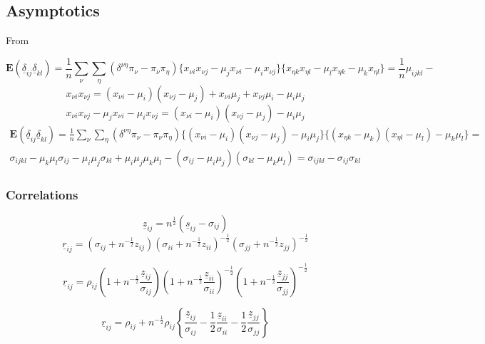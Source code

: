 \documentclass[
  12pt,
  letterpaper,
  DIV=11,
  numbers=noendperiod]{scrartcl}
\newcommand{\ul}[1]{\underline{#1}}
\begin{document}
\subsection{Asymptotics}\label{asymptotics}

From

\[
\mathbf{E}(\ul{\delta}_{ij}\ul{\delta}_{kl})=\frac{1}{n}\sum_\nu\sum_\eta(\delta^{\nu\eta}\pi_\nu-\pi_\nu\pi_\eta)
\{x_{\nu i}x_{\nu j}
-\mu_jx_{\nu i}-\mu_ix_{\nu j}\}\{x_{\eta k}x_{\eta l}
-\mu_lx_{\eta k}-\mu_kx_{\eta l}\}=\frac{1}{n}\mu_{ijkl}-
\] \[
x_{\nu i}x_{\nu j}=(x_{\nu i}-\mu_i)(x_{\nu j}-\mu_j)+x_{\nu i}\mu_j+x_{\nu j}\mu_i-\mu_i\mu_j
\] \[x_{\nu i}x_{\nu j}
-\mu_jx_{\nu i}-\mu_ix_{\nu j}=(x_{\nu i}-\mu_i)(x_{\nu j}-\mu_j)-\mu_i\mu_j
\] \begin{multline}
\mathbf{E}(\ul{\delta}_{ij}\ul{\delta}_{kl})=\frac{1}{n}\sum_\nu\sum_\eta(\delta^{\nu\eta}\pi_\nu-\pi_\nu\pi_\eta)
\{(x_{\nu i}-\mu_i)(x_{\nu j}-\mu_j)-\mu_i\mu_j\}\{(x_{\eta k}-\mu_k)(x_{\eta l}-\mu_l)-\mu_k\mu_l\}=\\
\sigma_{ijkl}-\mu_k\mu_l\sigma_{ij}-\mu_i\mu_j\sigma_{kl}+\mu_i\mu_j\mu_k\mu_l-(\sigma_{ij}-\mu_i\mu_j)(\sigma_{kl}-\mu_k\mu_l)=\sigma_{ijkl}-\sigma_{ij}\sigma_{kl}
\end{multline}

\subsubsection{Correlations}\label{correlations}

\[
\ul{z}_{ij}=n^\frac12(\ul{s}_{ij}-\sigma_{ij})
\] \[
\ul{r}_{ij}=(\sigma_{ij}+n^{-\frac12}z_{ij})(\sigma_{ii}+n^{-\frac12}z_{ii})^{-\frac12}(\sigma_{jj}+n^{-\frac12}z_{jj})^{-\frac12}
\]

\[
\ul{r}_{ij}=\rho_{ij}(1+n^{-\frac12}\frac{\ul{z}_{ij}}{\sigma_{ij}})(1+n^{-\frac12}\frac{\ul{z}_{ii}}{\sigma_{ii}})^{-\frac12}(1+n^{-\frac12}\frac{\ul{z}_{jj}}{\sigma_{jj}})^{-\frac12}
\]

\[
\ul{r}_{ij}=\rho_{ij}+n^{-\frac12}\rho_{ij}\left\{\frac{\ul{z}_{ij}}{\sigma_{ij}}-\frac12\frac{\ul{z}_{ii}}{\sigma_{ii}}-\frac12\frac{\ul{z}_{jj}}{\sigma_{jj}}\right\}
\]
\end{document}

